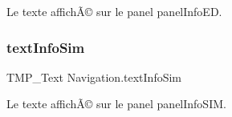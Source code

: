 Le texte affichÃ© sur le panel panel\+Info\+ED. 

\mbox{\label{class_navigation_aefa9a0108a63c721559a2ede11fad997}} 
\subsubsection{\texorpdfstring{text\+Info\+Sim}{textInfoSim}}
{\footnotesize\ttfamily T\+M\+P\+\_\+\+Text Navigation.\+text\+Info\+Sim\hspace{0.3cm}{\ttfamily [private]}}



Le texte affichÃ© sur le panel panel\+Info\+S\+IM. 

